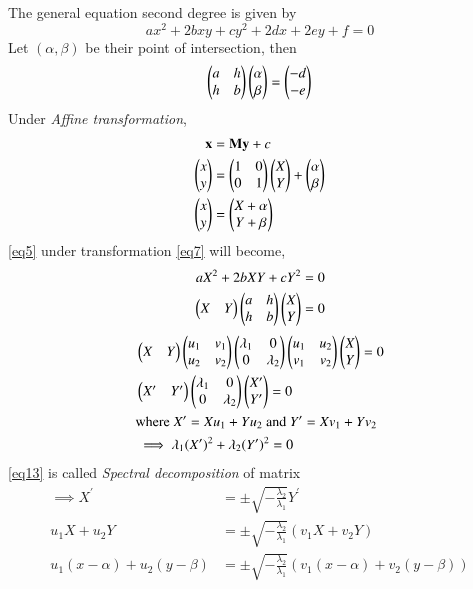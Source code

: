 \documentclass[journal,12pt,twocolumn]{IEEEtran}
\begin{document}
The general equation second degree is given by
\begin{equation}\label{eq5}
	ax^2 + 2bxy + cy^2 + 2dx + 2ey + f = 0
\end{equation}
Let $(\alpha,\beta)$ be their point of intersection, then
\begin{equation}\label{eq6}
	\begin{pmatrix} a & h\\ h & b\end{pmatrix}\begin{pmatrix}\alpha \\ \beta\end{pmatrix} = \begin{pmatrix}-d \\ -e\end{pmatrix}
\end{equation}
Under \textit{Affine transformation},
\begin{align}
	\mathbf{x} &= \mathbf{M}\mathbf{y} + c\\
	\begin{pmatrix}x \\ y\end{pmatrix} &= \begin{pmatrix}1 & 0 \\ 0 & 1\end{pmatrix} \begin{pmatrix}X \\ Y\end{pmatrix} + \begin{pmatrix}\alpha \\ \beta\end{pmatrix}\\
	\label{eq7}\begin{pmatrix}x \\ y\end{pmatrix} &= \begin{pmatrix}X+\alpha \\ Y+\beta\end{pmatrix}
\end{align}
\eqref{eq5} under transformation \eqref{eq7} will become,
\begin{align}
aX^2 + 2bXY + cY^2 = 0\label{eq8}\\
\begin{pmatrix}X & Y\end{pmatrix} \begin{pmatrix}a & h \\ h & b\end{pmatrix} \begin{pmatrix}X \\ Y\end{pmatrix} = 0\label{eq9}
\end{align}
\begin{align}
	&\begin{pmatrix}X & Y\end{pmatrix} \begin{pmatrix}u_1 & v_1 \\ u_2 & v_2\end{pmatrix} \begin{pmatrix}\lambda_1 & 0\\ 0 & \lambda_2\end{pmatrix} \begin{pmatrix}u_1 & u_2 \\ v_1 & v_2\end{pmatrix} \begin{pmatrix}X \\ Y\end{pmatrix} = 0\label{eq11}\\
	&\begin{pmatrix}X^\prime & Y^\prime\end{pmatrix}  \begin{pmatrix}\lambda_1 & 0\\ 0 & \lambda_2\end{pmatrix} \begin{pmatrix}X^\prime \\ Y^\prime\end{pmatrix} = 0\\
	\label{eq12}
	&\text{where } X^\prime = Xu_1 + Yu_2 \text{ and } Y^\prime = Xv_1 + Yv_2\\
	\label{eq13}
	&\implies \lambda_1 (X^\prime)^2 + \lambda_2 (Y^\prime)^2 = 0
\end{align}
\eqref{eq13} is called \textit{Spectral decomposition} of matrix
\begin{align}
	\implies X^\prime &= \pm \sqrt{-\frac{\lambda_2}{\lambda_1}}Y^\prime\\	
	u_1X + u_2Y &= \pm \sqrt{-\frac{\lambda_2}{\lambda_1}}(v_1X + v_2Y)\\
	u_1(x-\alpha) + u_2(y-\beta) &= \pm \sqrt{-\frac{\lambda_2}{\lambda_1}}(v_1(x-\alpha) + v_2(y-\beta))\label{eq14}
\end{align}
\end{document}
